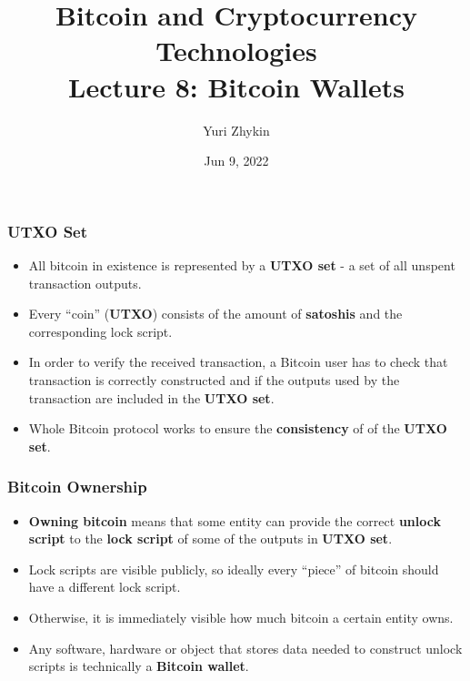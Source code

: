 \documentclass{beamer}
\title{
  Bitcoin and Cryptocurrency Technologies \\
  Lecture 8: Bitcoin Wallets
}
\author{Yuri Zhykin}
\date{Jun 9, 2022}
\begin{document}
\frame{\titlepage}

\begin{frame}
  \frametitle{UTXO Set}
  \begin{itemize}
  \item All bitcoin in existence is represented by a \textbf{UTXO set} - a set
    of all unspent transaction outputs.
  \item Every ``coin'' (\textbf{UTXO}) consists of the amount of
    \textbf{satoshis} and the corresponding lock script.
  \item In order to verify the received transaction, a Bitcoin user has to check
    that transaction is correctly constructed and if the outputs used by the
    transaction are included in the \textbf{UTXO set}.
  \item Whole Bitcoin protocol works to ensure the \textbf{consistency} of of
    the \textbf{UTXO set}.
  \end{itemize}
\end{frame}

\begin{frame}
  \frametitle{Bitcoin Ownership}
  \begin{itemize}
  \item \textbf{Owning bitcoin} means that some entity can provide the correct
    \textbf{unlock script} to the \textbf{lock script} of some of the outputs in
    \textbf{UTXO set}.
  \item Lock scripts are visible publicly, so ideally every ``piece'' of bitcoin
    should have a different lock script.
  \item Otherwise, it is immediately visible how much bitcoin a certain entity
    owns.
  \item Any software, hardware or object that stores data needed to construct
    unlock scripts is technically a \textbf{Bitcoin wallet}.
  \end{itemize}
\end{frame}
\end{document}
